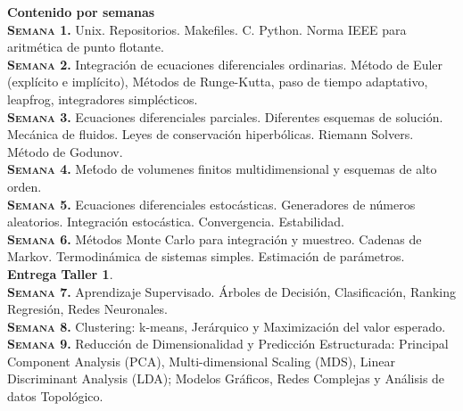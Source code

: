 \documentclass[letterpaper,10pt,onecolumn]{article}
\begin{document}
\noindent\textbf{\large {} \quad Contenido por
  semanas}\\[-0.2cm] 



\noindent\normalsize\textbf{\textsc{Semana 1.}}
Unix. Repositorios. Makefiles. C. Python. Norma IEEE para aritm\'etica de punto
flotante. 
\\[-0.3cm]

\noindent\textbf{\textsc{Semana 2.}} Integraci\'on de ecuaciones
diferenciales ordinarias. M\'etodo de Euler (expl\'icito e
impl\'icito), M\'etodos de Runge-Kutta, paso de tiempo adaptativo,
leapfrog, integradores simpl\'ecticos.
\\[-0.3cm]  

\noindent\textbf{\textsc{Semana 3.}} 
Ecuaciones diferenciales parciales. Diferentes esquemas de
soluci\'on. Mec\'anica de fluidos. Leyes de conservaci\'on
hiperb\'olicas. Riemann Solvers. M\'etodo de Godunov.
\\[-0.3cm]  

\noindent\textbf{\textsc{Semana 4.}} 
Me\'todo de volumenes finitos multidimensional y esquemas de alto
orden. 
\\[-0.3cm]  

\noindent\textbf{\textsc{Semana 5.}}
Ecuaciones diferenciales estoc\'asticas. Generadores de
n\'umeros aleatorios. Integraci\'on
estoc\'astica. Convergencia. Estabilidad.
\\[-0.3cm] 

\noindent\textbf{\textsc{Semana 6.}} 
M\'etodos Monte Carlo para integraci\'on y muestreo. 
Cadenas de Markov. Termodin\'amica de sistemas
simples. Estimaci\'on de par\'ametros. {\bf Entrega Taller 1}.
\\[-0.3cm]  

\noindent\textbf{\textsc{Semana 7.}} 
Aprendizaje Supervisado. Árboles de Decisión, Clasificación, Ranking
Regresión, Redes Neuronales. 
\\[-0.3cm]  

\noindent\textbf{\textsc{Semana 8.}} 
Clustering: k-means, Jerárquico y Maximización del valor esperado.
\\[-0.3cm] 

\noindent\textbf{\textsc{Semana 9.}} 
Reducción de Dimensionalidad y Predicción Estructurada: Principal
Component Analysis (PCA), Multi-dimensional Scaling (MDS), Linear
Discriminant Analysis (LDA); Modelos Gráficos, Redes Complejas y
Análisis de datos Topológico.   
\\[-0.3cm] 
\end{document}
